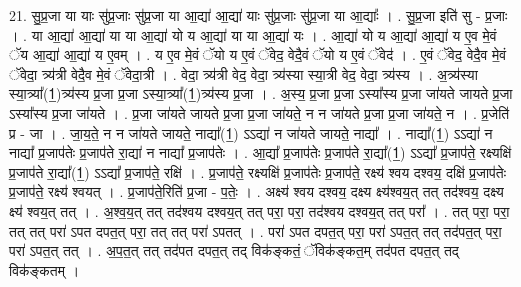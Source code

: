 \documentclass[17pt]{extarticle}
\begin{document}
21. सु॒प्र॒जा या याः सु॑प्र॒जाः सु॑प्र॒जा या आ॒द्या॑ आ॒द्या॑ याः सु॑प्र॒जाः सु॑प्र॒जा या आ॒द्याः᳚ । . सु॒प्र॒जा इति॑ सु - प्र॒जाः । . या आ॒द्या॑ आ॒द्या॑ या या आ॒द्या॑ यो य आ॒द्या॑ या या आ॒द्या॑ यः । . आ॒द्या॑ यो य आ॒द्या॑ आ॒द्या॑ य ए॒व मे॒वं ॅय आ॒द्या॑ आ॒द्या॑ य ए॒वम् । . य ए॒व मे॒वं ॅयो य ए॒वं ॅवेद॒ वेदै॒वं ॅयो य ए॒वं ॅवेद॑ । . ए॒वं ॅवेद॒ वेदै॒व मे॒वं ॅवेदा॒ त्र्य॑त्री वेदै॒व मे॒वं ॅवेदा॒त्री । . वेदा॒ त्र्य॑त्री वेद॒ वेदा॒ त्र्य॑स्या स्या॒त्री वेद॒ वेदा॒ त्र्य॑स्य । . अ॒त्र्य॑स्या स्या॒त्र्या᳚(1॒)त्र्य॑स्य प्र॒जा प्र॒जा ऽस्या॒त्र्या᳚(1॒)त्र्य॑स्य प्र॒जा । . अ॒स्य॒ प्र॒जा प्र॒जा ऽस्या᳚स्य प्र॒जा जा॑यते जायते प्र॒जा ऽस्या᳚स्य प्र॒जा जा॑यते । . प्र॒जा जा॑यते जायते प्र॒जा प्र॒जा जा॑यते॒ न न जा॑यते प्र॒जा प्र॒जा जा॑यते॒ न । . प्र॒जेति॑ प्र - जा । . जा॒य॒ते॒ न न जा॑यते जायते॒ नाद्या᳚(1॒) ऽऽद्या॑ न जा॑यते जायते॒ नाद्या᳚ । . नाद्या᳚(1॒) ऽऽद्या॑ न नाद्या᳚ प्र॒जाप॑तेः प्र॒जाप॑ते रा॒द्या॑ न नाद्या᳚ प्र॒जाप॑तेः । . आ॒द्या᳚ प्र॒जाप॑तेः प्र॒जाप॑ते रा॒द्या᳚(1॒) ऽऽद्या᳚ प्र॒जाप॑ते॒ रक्ष्यक्षि॑ प्र॒जाप॑ते रा॒द्या᳚(1॒) ऽऽद्या᳚ प्र॒जाप॑ते॒ रक्षि॑ । . प्र॒जाप॑ते॒ रक्ष्यक्षि॑ प्र॒जाप॑तेः प्र॒जाप॑ते॒ रक्ष्य॑ श्वय दश्वय॒ दक्षि॑ प्र॒जाप॑तेः प्र॒जाप॑ते॒ रक्ष्य॑ श्वयत् । . प्र॒जाप॑ते॒रिति॑ प्र॒जा - प॒तेः॒ । . अक्ष्य॑ श्वय दश्वय॒ दक्ष्य क्ष्य॑श्वय॒त् तत् तद॑श्वय॒ दक्ष्य क्ष्य॑ श्वय॒त् तत् । . अ॒श्व॒य॒त् तत् तद॑श्वय दश्वय॒त् तत् परा॒ परा॒ तद॑श्वय दश्वय॒त् तत् परा᳚ । . तत् परा॒ परा॒ तत् तत् परा॑ ऽपत दपत॒त् परा॒ तत् तत् परा॑ ऽपतत् । . परा॑ ऽपत दपत॒त् परा॒ परा॑ ऽपत॒त् तत् तद॑पत॒त् परा॒ परा॑ ऽपत॒त् तत् । . अ॒प॒त॒त् तत् तद॑पत दपत॒त् तद् विक॑ङ्कतं॒ ॅविक॑ङ्कत॒म् तद॑पत दपत॒त् तद् विक॑ङ्कतम् । \newline
\end{document}
